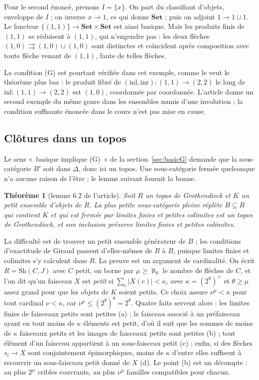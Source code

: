\documentclass[11pt,a4paper]{amsart}
\theoremstyle{definition}
\theoremstyle{plain}
\newtheorem{theoreme}{Théorème}
\theoremstyle{remark}
\newcommand{\Set}{\mathbf{Set}}
\begin{document}
Pour le second énoncé, prenons $I=\{x\}$. On part du classifiant d'objets, enveloppe de $I$ ; on inverse $x\to1$, ce qui donne $\Set$ ; puis on adjoint $1\to1\sqcup1$. Le foncteur $\{(1,1)\}\to\Set\times\Set$ est ainsi basique. Mais les produits finis de $(1,1)$ se réduisent à $(1,1)$, qui n'engendre pas : les deux flèches $(1,0)\rightrightarrows(1,0)\sqcup(1,0)$ sont distinctes et coïncident après composition avec toute flèche venant de $(1,1)$, faute de telles flèches.

La condition (G) est pourtant vérifiée dans cet exemple, comme le veut le théorème plus bas : le produit fibré de $(\mathrm{inl},\mathrm{inr})\colon(1,1)\to(2,2)$ le long de $\mathrm{inl}\colon(1,1)\to(2,2)$ est $(1,0)$, coordonnée par coordonnée. L'article donne un second exemple du même genre dans les ensembles munis d'une involution ; la condition suffisante énoncée dans le cours n'est pas mise en cause.

\subsection{Clôtures dans un topos}

Le sens «~basique implique (G)~» de la section~\ref{sec:basicG} demande que la sous-catégorie $B'$ soit dans $\Delta$, donc ici un topos. Une sous-catégorie fermée quelconque n'a aucune raison de l'être ; le lemme suivant fournit la bonne.

\begin{theoreme}[lemme 6.2 de l'article]
Soit $R$ un topos de Grothendieck et $K$ un petit ensemble d'objets de $R$. La plus petite sous-catégorie pleine réplète $B\subseteq R$ qui contient $K$ et qui est fermée par limites finies et petites colimites est un topos de Grothendieck, et son inclusion préserve limites finies et petites colimites.
\end{theoreme}

La difficulté est de trouver un petit ensemble générateur de $B$ ; les conditions d'exactitude de Giraud passent d'elles-mêmes de $R$ à $B$, puisque limites finies et colimites s'y calculent dans $R$. La preuve est un argument de cardinalité. On écrit $R=\mathrm{Sh}(C,J)$ avec $C$ petit, on borne par $\mu\ge\aleph_0$ le nombre de flèches de $C$, et l'on dit qu'un faisceau $X$ est \emph{petit} si $\sum_c|X(c)|<\kappa$, avec $\kappa=(2^\theta)^+$ et $\theta\ge\mu$ assez grand pour que les objets de $K$ soient petits. Ce choix assure $\nu^\mu<\kappa$ pour tout cardinal $\nu<\kappa$, car $\nu^\mu\le(2^\theta)^\theta=2^\theta$. Quatre faits servent alors : les limites finies de faisceaux petits sont petites (a) ; le faisceau associé à un préfaisceau ayant en tout moins de $\kappa$ éléments est petit, d'où il suit que les sommes de moins de $\kappa$ faisceaux petits et les images de faisceaux petits sont petites (b) ; tout élément d'un faisceau appartient à un sous-faisceau petit (c) ; enfin, si des flèches $s_l\to X$ sont conjointement épimorphiques, moins de $\kappa$ d'entre elles suffisent à recouvrir un sous-faisceau petit donné de $X$ (d). Le point (b) est un décompte : au plus $2^\mu$ cribles couvrants, au plus $\nu^\mu$ familles compatibles pour chacun.
\end{document}
